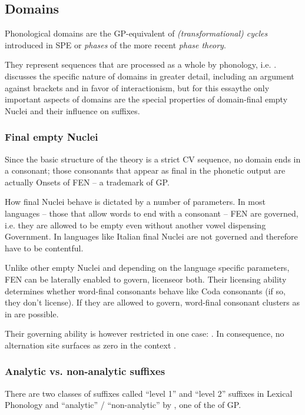 \subsection{Domains}
\label{subsec:intro:domains}

Phonological domains are the \gls{GP}-equivalent of
\emph{(transformational) cycles} introduced in SPE \parencite{chomsky1968}
or \emph{phases} of the more recent \emph{phase theory}.

They represent sequences that are processed as a whole by phonology, i.e.
.
\Textcite{scheer2012} discusses the specific nature of domains in greater
detail, including an argument against brackets and in favor of
interactionism, but for this essay\co the only important aspects of
domains are the special properties of domain-final empty Nuclei and
their influence on suffixes.


\subsubsection{Final empty Nuclei}
Since the basic structure of the theory is a strict CV sequence,
no domain ends in a consonant; those consonants that appear as final
in the phonetic output are actually Onsets of \gls{FEN}
-- a trademark of \gls{GP}.

How final Nuclei behave is dictated by a number of parameters.
In most languages -- those that allow words to end with a consonant --
\gls{FEN} are governed, i.e. they are allowed to be empty even without
another vowel dispensing Government.
In languages like Italian final Nuclei are not governed and therefore
have to be contentful.

Unlike other empty Nuclei and depending on the language specific parameters,
\gls{FEN} can be laterally enabled to govern, license\co or both.
Their licensing ability determines whether word-final consonants behave
like Coda consonants (if so, they don't license).
If they are allowed to govern, word-final consonant clusters as in 
are possible. \parencite[appendix~1]{scheer2004}

Their governing ability is however restricted in one case:
.
In consequence, no alternation site surfaces as zero in the context
.


\subsubsection{Analytic vs. non-analytic suffixes}
There are two classes of suffixes called \enquote{level 1} and
\enquote{level 2} suffixes in Lexical Phonology and
\enquote{analytic} / \enquote{non-analytic} by ,
one of the  of \gls{GP}.

